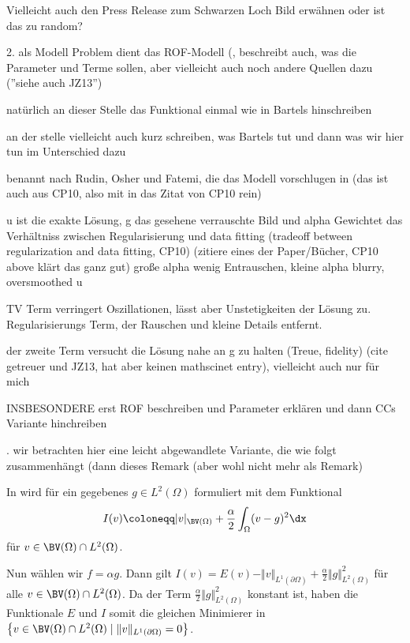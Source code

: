 Vielleicht auch den Press Release zum Schwarzen Loch Bild erwähnen oder ist
das zu random?


\medskip

2. als Modell Problem dient das ROF-Modell (\cite[sec 6.2.1]{CP10}, beschreibt
auch,
was die Parameter und Terme sollen, aber vielleicht auch noch andere Quellen 
dazu (''siehe auch JZ13'')

\medskip
natürlich an dieser Stelle das Funktional einmal wie in Bartels hinschreiben

an der stelle vielleicht auch kurz schreiben, was Bartels tut und dann was wir
hier tun im Unterschied dazu

\medskip

benannt nach Rudin, Osher und Fatemi, die das Modell vorschlugen in
\cite{ROF92} (das ist auch aus CP10, also mit in das Zitat von CP10 rein)

\medskip
u ist die exakte Lösung, g das gesehene verrauschte Bild und alpha Gewichtet 
das Verhältniss zwischen Regularisierung und data fitting (tradeoff
between regularization and data fitting, CP10)
(zitiere eines der Paper/Bücher, CP10 above klärt das ganz gut)
große alpha wenig Entrauschen, kleine alpha blurry, oversmoothed u
\cite{JZ13}

\medskip
TV Term verringert Oszillationen, lässt aber Unstetigkeiten der Lösung zu.
Regularisierungs Term, der Rauschen und kleine Details entfernt.

\medskip
der zweite Term versucht die Lösung nahe an g zu halten (Treue, fidelity) (cite
getreuer und JZ13, hat aber keinen mathscinet entry), vielleicht auch nur
für mich

\medskip
INSBESONDERE erst ROF beschreiben und Parameter erklären und dann CCs 
Variante hinchreiben

. wir betrachten hier eine leicht abgewandlete Variante, die wie folgt
zusammenhängt (dann dieses Remark (aber wohl nicht mehr als Remark)

\begin{remark}
  In \cite[Kapitel~10.1.3]{Bar15} wird  für ein
  gegebenes $g\in L^2(\Omega)$ formuliert
  mit dem Funktional 
  \begin{align*}
    I(v)\coloneqq |v|_{\BV(\Omega)} + \frac{\alpha}{2}\int_\Omega (v-g)^2\dx
  \end{align*}
  für $v\in \BV(\Omega)\cap L^2(\Omega)$.

  Nun wählen wir $f = \alpha g$. Dann gilt
  $I(v) = E(v) - \Vert v\Vert_{L^1(\partial \Omega)}+ 
  \frac{\alpha}{2}\Vert g\Vert_{L^2(\Omega)}^2$ für alle 
  $v\in \BV(\Omega)\cap L^2(\Omega)$. Da der Term $\frac{\alpha}{2}\Vert
  g\Vert_{L^2(\Omega)}^2$ konstant ist, haben die Funktionale $E$ und $I$ somit
  die gleichen Minimierer in $\left\{v\in\BV(\Omega)\cap L^2(\Omega)\mid 
  \Vert v\Vert_{L^1(\partial\Omega)}=0\right\}$.
\end{remark}


